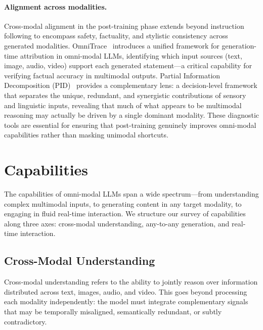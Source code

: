 \documentclass{article}
\begin{document}
\paragraph{Alignment across modalities.}
Cross-modal alignment in the post-training phase extends beyond instruction following to encompass safety, factuality, and stylistic consistency across generated modalities.
OmniTrace~\cite{placeholder2026omnitrace} introduces a unified framework for generation-time attribution in omni-modal LLMs, identifying which input sources (text, image, audio, video) support each generated statement---a critical capability for verifying factual accuracy in multimodal outputs.
Partial Information Decomposition (PID)~\cite{placeholder2026pid} provides a complementary lens: a decision-level framework that separates the unique, redundant, and synergistic contributions of sensory and linguistic inputs, revealing that much of what appears to be multimodal reasoning may actually be driven by a single dominant modality.
These diagnostic tools are essential for ensuring that post-training genuinely improves omni-modal capabilities rather than masking unimodal shortcuts.

\section{Capabilities}
\label{sec:capabilities}

The capabilities of omni-modal LLMs span a wide spectrum---from understanding complex multimodal inputs, to generating content in any target modality, to engaging in fluid real-time interaction.
We structure our survey of capabilities along three axes: cross-modal understanding, any-to-any generation, and real-time interaction.

\subsection{Cross-Modal Understanding}

Cross-modal understanding refers to the ability to jointly reason over information distributed across text, images, audio, and video.
This goes beyond processing each modality independently: the model must integrate complementary signals that may be temporally misaligned, semantically redundant, or subtly contradictory.
\end{document}
